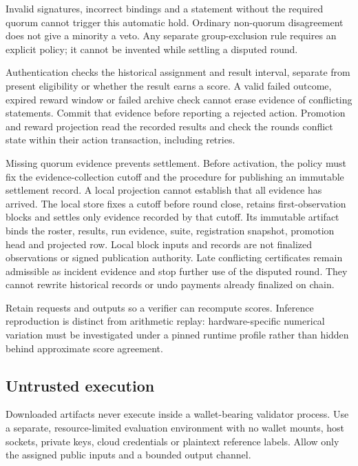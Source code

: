 Invalid signatures, incorrect bindings and a statement without the required
quorum cannot trigger this automatic hold. Ordinary non-quorum disagreement
does not give a minority a veto. Any separate group-exclusion rule requires
an explicit policy; it cannot be invented while settling a disputed round.

Authentication checks the historical assignment and result interval, separate
from present eligibility or whether the result earns a score. A valid failed
outcome, expired reward window or failed archive check cannot erase evidence
of conflicting statements. Commit that evidence before reporting a rejected
action. Promotion and reward projection read the recorded results and check
the round\textquotesingle s conflict state within their action transaction, including retries.

Missing quorum evidence prevents settlement. Before activation, the policy
must fix the evidence-collection cutoff and the procedure for publishing an
immutable settlement record. A local projection cannot establish that all
evidence has arrived. The local store fixes a cutoff before round close,
retains first-observation blocks and settles only evidence recorded by that
cutoff. Its immutable artifact binds the roster, results, run evidence, suite,
registration snapshot, promotion head and projected row. Local block inputs
and records are not finalized observations or signed publication authority.
Late conflicting certificates remain admissible as
incident evidence and stop further use of the disputed round. They cannot
rewrite historical records or undo payments already finalized on chain.

Retain requests and outputs so a verifier can recompute scores. Inference
reproduction is distinct from arithmetic replay: hardware-specific numerical
variation must be investigated under a pinned runtime profile rather than
hidden behind approximate score agreement.

\subsection{Untrusted execution}\label{44-untrusted-execution}

Downloaded artifacts never execute inside a wallet-bearing validator process.
Use a separate, resource-limited evaluation environment with no wallet mounts,
host sockets, private keys, cloud credentials or plaintext reference labels.
Allow only the assigned public inputs and a bounded output channel.

